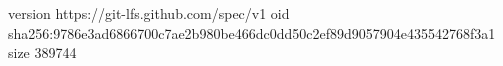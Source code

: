 version https://git-lfs.github.com/spec/v1
oid sha256:9786e3ad6866700c7ae2b980be466dc0dd50c2ef89d9057904e435542768f3a1
size 389744
